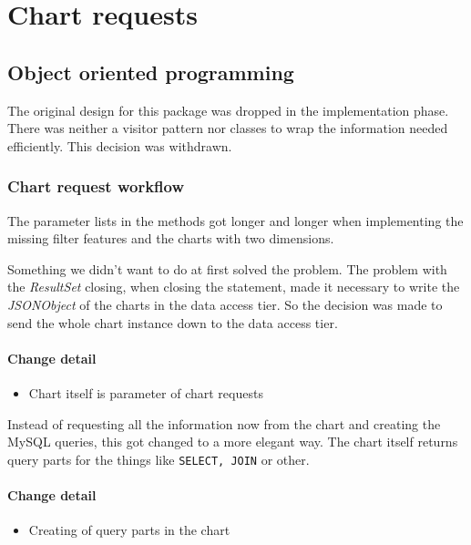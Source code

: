 \section{Chart requests}




\subsection{Object oriented programming}
The original design for this package was dropped in the implementation phase.
There was neither a visitor pattern nor classes to wrap the information
needed efficiently. This decision was withdrawn.

\subsubsection{Chart request workflow} \label{chart}
The parameter lists in the methods got longer 
and longer when implementing the missing filter features
and the charts with two dimensions.

Something we didn't want to do at first solved the problem. The problem 
with the \textit{ResultSet} closing, when closing the statement, made it
necessary to write the \textit{JSONObject} of the charts in the
data access tier. So the decision was made to send the whole chart instance
down to the data access tier. 

\paragraph{Change detail}
\begin{itemize}
  \item Chart itself is parameter of chart requests
\end{itemize}

Instead of requesting all the information now from the chart
and creating the MySQL queries, this got changed to a more elegant way.
The chart itself returns query parts for the things like \texttt{SELECT, JOIN} or other.

\paragraph{Change detail}
\begin{itemize}
  \item Creating of query parts in the chart
\end{itemize}


